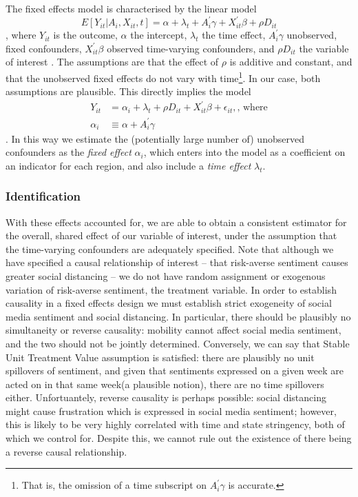 \documentclass[12pt,a4]{article}
\begin{document}
The fixed effects model is characterised by the linear model  
\begin{equation}
  E[Y_{it} | A_i , X_{it}, t] = \alpha + \lambda_t + A^\prime_i \gamma + X^\prime_{it} \beta + \rho D_{it}
\end{equation}
, where \(Y_{it}\) is the outcome, \(\alpha\) the intercept, \(\lambda_t\) the time effect, \(A^\prime_i \gamma\) unobserved, fixed confounders, \(X^\prime_{it} \beta\) observed time-varying confounders, and \(\rho D_{it}\) the variable of interest \parencite[222]{angristMostlyHarmlessEconometrics2009a}. The assumptions are that the effect of \(\rho\) is additive and constant, and that the unobserved fixed effects do not vary with time\footnote{That is, the omission of a time subscript on \(A^\prime_i \gamma\) is accurate.}. In our case, both assumptions are plausible. This directly implies the model 
\begin{align}
  Y_{it} &= \alpha_i + \lambda_t + \rho D_{it} + X^\prime_{it} \beta + \epsilon_{it}, \textrm{, where} \\
  \alpha_i &\equiv \alpha + A_i^\prime \gamma
\end{align}. In this way we estimate the (potentially large number of) unobserved confounders as the \textit{fixed effect} \(\alpha_i\), which enters into the model as a coefficient on an indicator for each region, and also include a \textit{time effect} \(\lambda_t\). 
\subsubsection{Identification}
With these effects accounted for, we are able to obtain a consistent estimator for the overall, shared effect of our variable of interest, under the assumption that the time-varying confounders are adequately specified. Note that although we have specified a causal relationship of interest -- that risk-averse sentiment causes greater social distancing -- we do not have random assignment or exogenous variation of risk-averse sentiment, the treatment variable. In order to establish causality in a fixed effects design we must establish strict exogeneity of social media sentiment and social distancing. In particular, there should be plausibly no simultaneity or reverse causality: mobility cannot affect social media sentiment, and the two should not be jointly determined. Conversely, we can say that Stable Unit Treatment Value assumption is satisfied: there are plausibly no unit spillovers of sentiment, and given that sentiments expressed on a given week are acted on in that same week(a plausible notion), there are no time spillovers either.  Unfortuantely, reverse causality is perhaps possible: social distancing might cause frustration which is expressed in social media sentiment; however, this is likely to be very highly correlated with time and state stringency, both of which we control for. Despite this, we cannot rule out the existence of there being a reverse causal relationship. 
\end{document}
